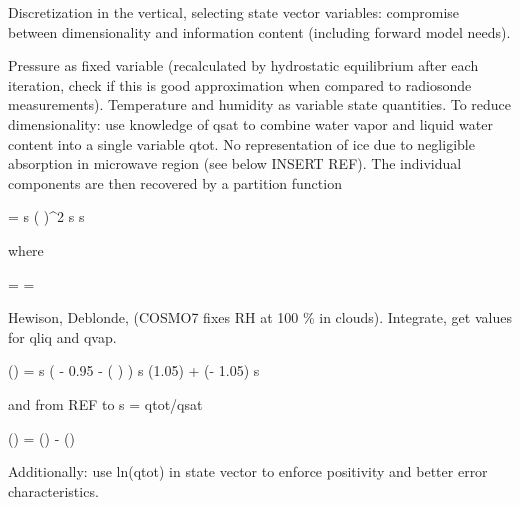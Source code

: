 \stopsection


\startsection[title=Representation of the Atmospheric State]

    Discretization in the vertical, selecting state vector variables:
    compromise between dimensionality and information content (including
    forward model needs).

    \startsubsection[title=The Choice of State Vector Variables]

        Pressure as fixed variable (recalculated by hydrostatic equilibrium
        after each iteration, check if this is good approximation when compared
        to radiosonde measurements). Temperature and humidity as variable
        state quantities. To reduce dimensionality: use knowledge of qsat to
        combine water vapor and liquid water content into a single variable
        qtot. No representation of ice due to negligible absorption in
        microwave region (see below INSERT REF). The individual components are
        then recovered by a partition function

        \startformula
            \DERIV{\QLIQ}{\RHL} =  \startcases
                 \MC s  \NR
                \NC \cos \left(   \right)^2
                     \le s  \EQCOMMA\NR
                  \lt s \NR
            \stopcases
        \stopformula

        where

        \startformula
            \RHL = \frac{\QTOT}{\QSAT} = \frac{\QVAP + \QLIQ}{\QSAT} \EQSTOP
        \stopformula

        Hewison, Deblonde, (COSMO7 fixes RH at 100 \% in clouds). Integrate,
        get values for qliq and qvap.

        \startformula
            \QLIQ(\RHL) = \startcases
                 \MC s  \NR
                \NC {} \left( \RHL - 0.95 - 
                    \cos \left(  \right) \right)
                     \le s  \NR
                \NC \QLIQ(1.05) + \QSAT (\RHL - 1.05)  \lt s \NR
            \stopcases
        \stopformula

        and from REF to s = qtot/qsat

        \startformula
            \QVAP(\RHL) = \QSAT(\RHL) - \QLIQ(\RHL) \EQSTOP
        \stopformula

        Additionally: use ln(qtot) in state vector to enforce positivity and
        better error characteristics.

